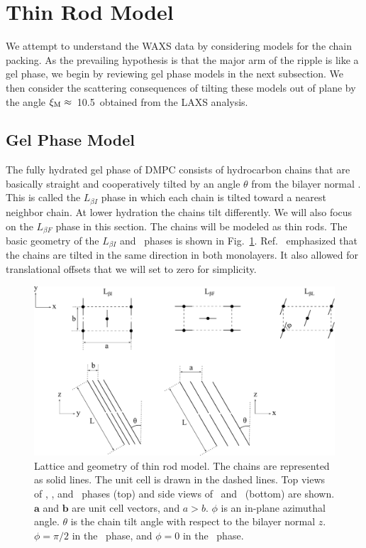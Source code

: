 \newpage
\section{Thin Rod Model}\label{sec:thin_rod_model}
We attempt to understand the WAXS data by considering models for the chain 
packing.  As the prevailing hypothesis is that the major arm of the ripple is 
like a gel phase, we begin by reviewing gel phase models in the next subsection.  
We then consider the scattering consequences of tilting these models out of 
plane by the angle $\xi_\text{M}\approx$~10.5\textdegree\ obtained from the LAXS analysis.

\subsection{Gel Phase Model}\label{sec:gel_model}
The fully hydrated gel phase of DMPC consists of hydrocarbon chains that are 
basically straight and cooperatively tilted by an angle $\theta$ from the 
bilayer normal \cite{ref:Smith88,ref:Tristram93,ref:Sun94,Tristram-Nagle02}. 
This is called the $L_{{\beta}I}$ phase in which each chain is tilted toward 
a nearest neighbor chain. At lower hydration the chains tilt differently. 
We will also focus on the $L_{{\beta}F}$ phase in this section.  The chains 
will be modeled as thin rods.  The basic geometry of the $L_{{\beta}I}$ 
and \LbetaF\ phases
is shown in Fig.~\ref{fig:gel_thin_rod}.  
Ref.~\cite{ref:Sun94} emphasized that the chains 
are tilted in the same direction in both monolayers. It also allowed for 
translational offsets that we will set to zero for simplicity.  

\begin{figure}[htbp]
  \centering
  \includegraphics[width=\textwidth]{figures/ripple/thin_rod_model/gel_thin_rod}
  \caption[Lattice and geometry of thin rod model]
  {Lattice and geometry of thin rod model. 
  The chains are represented as solid lines. The unit cell is drawn
  in the dashed lines.
  Top views of \LbetaI, \LbetaF, and \LbetaL\ phases (top)
  and side views of \LbetaI\ and \LbetaF\ (bottom) are shown.
  $\mathbf{a}$ and $\mathbf{b}$ are unit cell vectors, and $a > b$.
  $\phi$ is an in-plane azimuthal angle. 
  $\theta$ is the chain tilt angle with respect to the bilayer normal $z$.  
  $\phi=\pi/2$ in the \LbetaI\ phase, and $\phi=0$ in the \LbetaF\ phase.}
  \label{fig:gel_thin_rod}
\end{figure}

